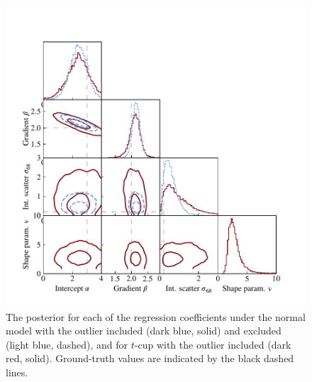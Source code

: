 \documentclass[fleqn,usenatbib]{mnras}
\begin{document}
\begin{figure}
    \includegraphics[width=\columnwidth]{graphics/corner_outlier_ncup.pdf}
    \caption{The posterior for each of the regression coefficients under the
    normal model with the outlier included (dark blue, solid) and excluded
    (light blue, dashed), and for $t$-cup with the outlier included (dark red,
    solid). Ground-truth values are indicated by the black dashed lines.}
    \label{fig:results.outlier.corner}
\end{figure}
\end{document}
